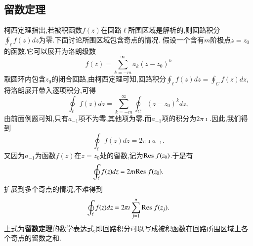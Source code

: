\subsection{留数定理}
\label{subsec:residue_theorem}
柯西定理指出,若被积函数$f(z)$在回路$\ell$所围区域是解析的,则回路积分$\oint_\ell f(z) dz$为零.下面讨论所围区域包含奇点的情况.
假设一个含有$m$阶极点$z=z_0$的函数,它可以展开为洛朗级数
$$
  f(z) = \sum_{k = -m} ^{\infty} a_k (z - z_0)^k  
$$
取圆环内包含$z_0$的闭合回路,由柯西定理可知,回路积分$\oint_\ell f(z) dz = \oint_C f(z) dz$, 将洛朗展开带入逐项积分,可得
$$
\oint_\ell f(z) dz = \sum_{k = -m} ^{\infty} \oint_C  (z - z_0)^k dz,
$$
由前面例题可知,只有$a_{-1}$项不为零,其他项为零.而$a_{-1}$项的积分为$2\pi\imath$.因此,我们得到
\begin{equation}
    \oint_\ell f(z) dz = 2\pi \imath a_{-1} .
\end{equation}
又因为$a_{-1}$为函数$f(z)$在$z=z_0$处的留数,记为${\mathrm{Res}\;} f(z_0)$.于是有
\begin{equation}
    \oint_\ell f(z) dz = 2\pi \imath {\mathrm{Res}\;} f(z_0) .
\end{equation}
扩展到多个奇点的情况,不难得到
\begin{equation}
    \oint_\ell f(z) dz = 2\pi \imath \sum_{j=1}^{n} {\mathrm{Res}\;} f(z_j) .
\end{equation}
上式为\textbf{留数定理}的数学表达式,即回路积分可以写成被积函数在回路所围区域上各个奇点的留数之和.

